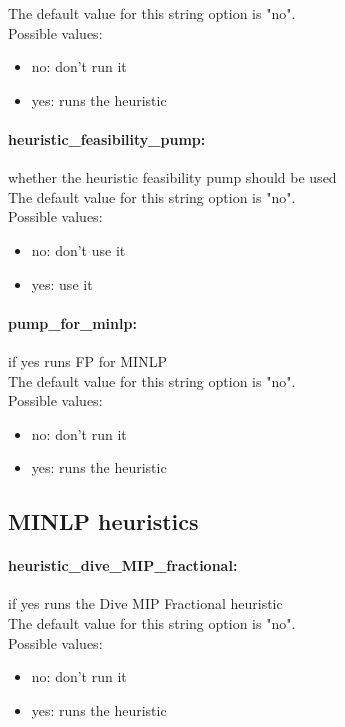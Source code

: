 The default value for this string option is "no".
\\ 
Possible values:
\begin{itemize}
   \item no: don't run it
   \item yes: runs the heuristic
\end{itemize}

\paragraph{heuristic\_feasibility\_pump:}\label{sec:heuristic_feasibility_pump} whether the heuristic feasibility pump should be used $\;$ \\

The default value for this string option is "no".
\\ 
Possible values:
\begin{itemize}
   \item no: don't use it
   \item yes: use it
\end{itemize}

\paragraph{pump\_for\_minlp:}\label{sec:pump_for_minlp} if yes runs FP for MINLP $\;$ \\

The default value for this string option is "no".
\\ 
Possible values:
\begin{itemize}
   \item no: don't run it
   \item yes: runs the heuristic
\end{itemize}

\subsection{MINLP heuristics}
\label{sec:MINLP_heuristics}
\paragraph{heuristic\_dive\_MIP\_fractional:}\label{sec:heuristic_dive_MIP_fractional} if yes runs the Dive MIP Fractional heuristic $\;$ \\

The default value for this string option is "no".
\\ 
Possible values:
\begin{itemize}
   \item no: don't run it
   \item yes: runs the heuristic
\end{itemize}

